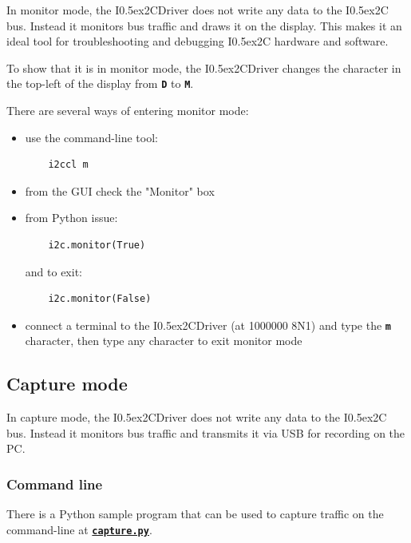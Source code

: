 \documentclass{article}
\newcommand{\two}{\raise0.5ex\hbox{\footnotesize{2}}}
\newcommand{\iic}{I\two{}C}
\newcommand{\iicdriver}{I\two{}CDriver}
\newcommand{\mach}[1]{\texttt{\textbf{#1}}}
\begin{document}
In monitor mode, the \iicdriver{} does not write any data to the \iic{} bus.
Instead it monitors bus traffic and draws it on the display.
This makes it an ideal tool for troubleshooting and debugging \iic{} hardware and software.

To show that it is in monitor mode, the \iicdriver{} changes the character in the top-left of the display from \mach{D} to \mach{M}.

There are several ways of entering monitor mode:

\begin{itemize}
\item use the command-line tool:

\begin{lstlisting}
    i2ccl m
\end{lstlisting}

\item from the GUI check the "Monitor" box
\item from Python issue:

\begin{lstlisting}
    i2c.monitor(True)
\end{lstlisting}
  
and to exit:

\begin{lstlisting}
    i2c.monitor(False)
\end{lstlisting}

\item connect a terminal to the \iicdriver{} (at 1000000 8N1) and type the \mach{m} character, then type any character to exit monitor mode
\end{itemize}

\subsection{Capture mode}

In capture mode, the \iicdriver{} does not write any data to the \iic{} bus.
Instead it monitors bus traffic and transmits it via USB for recording on the PC.

\subsubsection{Command line}\index{capture.py@\mach{capture.py}}

There is a Python sample program that can be used to capture traffic on the command-line at
\href{https://github.com/jamesbowman/i2cdriver/blob/master/python/samples/capture.py}{\mach{capture.py}}.
\end{document}
